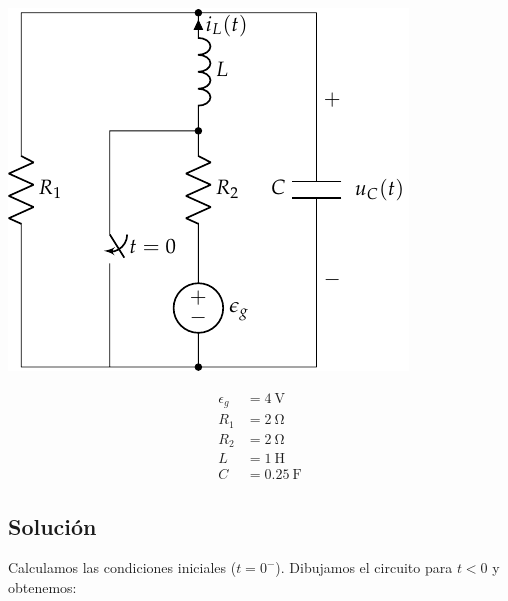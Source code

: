 \begin{minipage}{0.5\linewidth}
  \begin{center}
    \includegraphics{figuras/FM_4_9.pdf}
  \end{center}
\end{minipage}
\begin{minipage}{0.5\linewidth}
  \begin{align*}
    \epsilon_g &= \SI{4}{\volt}\\
    R_1 &= \SI{2}{\ohm}\\
    R_2 &= \SI{2}{\ohm}\\
    L &= \SI{1}{\henry}\\
    C &= \SI{0.25}{\farad}      
  \end{align*}
\end{minipage}

\subsection*{Solución}

Calculamos las condiciones iniciales ($t = 0^-$). Dibujamos el
circuito para $t < 0$ y obtenemos:

